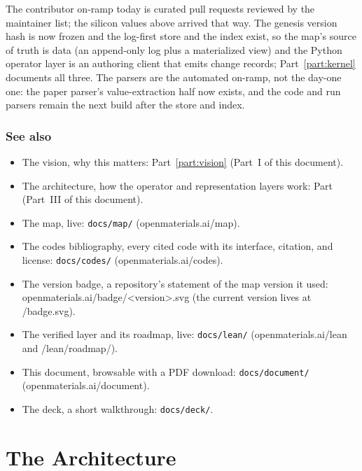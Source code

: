 \documentclass[11pt,a4paper]{article}
\begin{document}
The contributor on-ramp today is curated pull requests reviewed by the
maintainer list; the silicon values above arrived that way. The genesis
version hash is now frozen and the log-first store and the index exist, so the
map's source of truth is data (an append-only log plus a materialized view) and
the Python operator layer is an authoring client that emits change records;
Part~\ref{part:kernel} documents all three. The parsers are the automated
on-ramp, not the day-one one: the paper parser's value-extraction half now
exists, and the code and run parsers remain the next build after the store and
index.

\section*{See also}

\begin{itemize}[leftmargin=2em]
  \item The vision, why this matters: Part~\ref{part:vision} (Part~I of this document).
  \item The architecture, how the operator and representation layers work:
  Part~\ref{part:architecture} (Part~III of this document).
  \item The map, live: \texttt{docs/map/} (openmaterials.ai/map).
  \item The codes bibliography, every cited code with its interface, citation,
  and license: \texttt{docs/codes/} (openmaterials.ai/codes).
  \item The version badge, a repository's statement of the map version it
  used: openmaterials.ai/badge/\textless{}version\textgreater{}.svg (the
  current version lives at /badge.svg).
  \item The verified layer and its roadmap, live: \texttt{docs/lean/}
  (openmaterials.ai/lean and /lean/roadmap/).
  \item This document, browsable with a PDF download:
  \texttt{docs/document/} (openmaterials.ai/document).
  \item The deck, a short walkthrough: \texttt{docs/deck/}.
\end{itemize}

\part{The Architecture}
\label{part:architecture}
\end{document}

